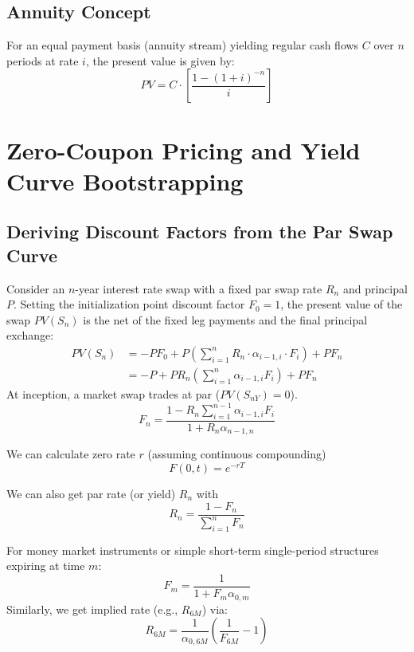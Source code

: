 \documentclass{article}
\begin{document}
\subsection{Annuity Concept}
For an equal payment basis (annuity stream) yielding regular cash flows $C$ over $n$ periods at rate $i$, the present value is given by:
\begin{equation}
    PV = C \cdot \left[ \frac{1 - (1+i)^{-n}}{i} \right]
\end{equation}

\section{Zero-Coupon Pricing and Yield Curve Bootstrapping}

\subsection{Deriving Discount Factors from the Par Swap Curve}
Consider an $n$-year interest rate swap with a fixed par swap rate $R_{n}$ and principal $P$. Setting the initialization point discount factor $F_0 = 1$, the present value of the swap $PV(S_n)$ is the net of the fixed leg payments and the final principal exchange:
\begin{align}
    PV(S_n) &= -PF_0 + P\left(\sum_{i=1}^n R_n \cdot \alpha_{i-1,i} \cdot F_i \right) +  PF_n \nonumber \\
    &= -P + PR_n \left(\sum_{i=1}^n \alpha_{i-1,i} F_i\right) + PF_{n}
\end{align}
At inception, a market swap trades at par ($PV(S_{nY}) = 0$).
\begin{equation}
    F_n = \frac{1 - R_n \sum_{i=1}^{n-1} \alpha_{i-1,i} F_i}{1 + R_n \alpha_{n-1,n}}
\end{equation}

We can calculate zero rate $r$ (assuming continuous compounding) \[F(0,t)=e^{-rT}\]

We can also get par rate (or yield) $R_n$ with \[R_n=\frac{1-F_n}{\sum_{i=1}^nF_n}\]

For money market instruments or simple short-term single-period structures expiring at time $m$:
\begin{equation}
    F_m = \frac{1}{1 + F_m \alpha_{0,m}}
\end{equation}
Similarly, we get implied rate (e.g., $R_{6M}$) via:
\begin{equation}
    R_{6M} = \frac{1}{\alpha_{0,6M}} \left( \frac{1}{F_{6M}} - 1 \right)
\end{equation}
\end{document}
